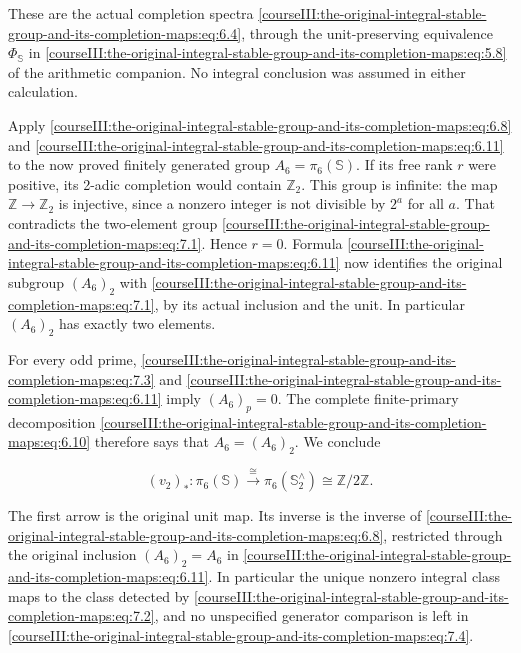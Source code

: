 These are the actual completion spectra \eqref{courseIII:the-original-integral-stable-group-and-its-completion-maps:eq:6.4}, through the unit-preserving equivalence \(\Phi_{\mathbb S}\) in \eqref{courseIII:the-original-integral-stable-group-and-its-completion-maps:eq:5.8} of the arithmetic companion. No integral conclusion was assumed in either calculation.

Apply \eqref{courseIII:the-original-integral-stable-group-and-its-completion-maps:eq:6.8} and \eqref{courseIII:the-original-integral-stable-group-and-its-completion-maps:eq:6.11} to the now proved finitely generated group \(A_6=\pi_6(\mathbb S)\). If its free rank \(r\) were positive, its 2-adic completion would contain \(\mathbb Z_2\). This group is infinite: the map \(\mathbb Z\to\mathbb Z_2\) is injective, since a nonzero integer is not divisible by \(2^a\) for all \(a\). That contradicts the two-element group \eqref{courseIII:the-original-integral-stable-group-and-its-completion-maps:eq:7.1}. Hence \(r=0\). Formula \eqref{courseIII:the-original-integral-stable-group-and-its-completion-maps:eq:6.11} now identifies the original subgroup \((A_6)_2\) with \eqref{courseIII:the-original-integral-stable-group-and-its-completion-maps:eq:7.1}, by its actual inclusion and the unit. In particular \((A_6)_2\) has exactly two elements.

For every odd prime, \eqref{courseIII:the-original-integral-stable-group-and-its-completion-maps:eq:7.3} and \eqref{courseIII:the-original-integral-stable-group-and-its-completion-maps:eq:6.11} imply \((A_6)_p=0\). The complete finite-primary decomposition \eqref{courseIII:the-original-integral-stable-group-and-its-completion-maps:eq:6.10} therefore says that \(A_6=(A_6)_2\). We conclude

\begin{equation}
\boxed{\ (v_2)_*:\pi_6(\mathbb S)
       \xrightarrow{\cong}\pi_6(\mathbb S^{\wedge}_2)
       \cong\mathbb Z/2\mathbb Z.\ }
 \label{courseIII:the-original-integral-stable-group-and-its-completion-maps:eq:7.4}
\end{equation}

The first arrow is the original unit map. Its inverse is the inverse of \eqref{courseIII:the-original-integral-stable-group-and-its-completion-maps:eq:6.8}, restricted through the original inclusion \((A_6)_2=A_6\) in \eqref{courseIII:the-original-integral-stable-group-and-its-completion-maps:eq:6.11}. In particular the unique nonzero integral class maps to the class detected by \eqref{courseIII:the-original-integral-stable-group-and-its-completion-maps:eq:7.2}, and no unspecified generator comparison is left in \eqref{courseIII:the-original-integral-stable-group-and-its-completion-maps:eq:7.4}.

